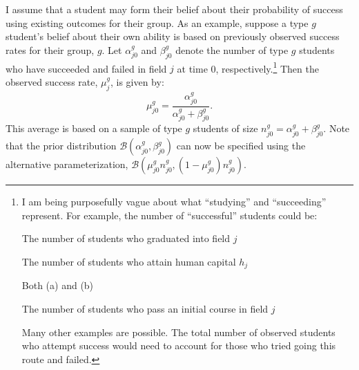 \documentclass[10 pt]{article}
\newcommand{\pr}[1]{\left( #1 \right)}
\begin{document}
I assume that a student may form their belief about their probability of success using existing outcomes for their group.
As an example, suppose a type $g$ student's belief about their own ability is based on previously observed success rates for their group, $g$. 
Let $\alpha_{j0}^g$ and $\beta_{j0}^g$ denote the number of type $g$ students who have succeeded and failed in field $j$ at time 0, respectively.\footnote{
   I am being purposefully vague about what ``studying'' and ``succeeding'' represent.
   For example, the number of ``successful'' students could be:
   \begin{footcount}
      \item The number of students who graduated into field $j$
      \item The number of students who attain human capital $h_j$
      \item Both (a) and (b)
      \item The number of students who pass an initial course in field $j$
    \end{footcount} 
   Many other examples are possible. The total number of observed students who attempt success would need to account for those who tried going this route and failed. 
}  
Then the observed success rate, $\mu_{j}^g$, is given by:
\begin{equation*}
\mu_{j0}^g = 
  \frac{\alpha_{j0}^g}{\alpha_{j0}^g + \beta_{j0}^g}.
\end{equation*}
This average is based on a sample of type $g$ students of size $n_{j0}^g = \alpha_{j0}^g + \beta_{j0}^g$.
Note that the prior distribution $\mathcal{B} \pr{\alpha_{j0}^g, \beta_{j0}^g}$ can now be specified using the alternative parameterization, $\mathcal{B} \pr{\mu_{j0}^g n_{j0}^g, (1 - \mu_{j0}^g) n_{j0}^g}$.
\end{document}
